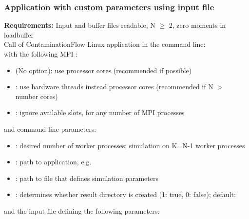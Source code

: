 \subsubsection{Application with custom parameters using input file}
\textbf{Requirements:} Input and buffer files readable, N $\geq$ 2, zero moments in loadbuffer\\[4pt]
Call of ContaminationFlow Linux application in the command line:
\leavevmode\\[-8pt]
with the following MPI :
\begin{itemize}[noitemsep,topsep=0pt, partopsep=0pt]
\item  (No option): use processor cores (recommended if possible)
\item {}: use hardware threads instead processor cores (recommended if N $>$ number cores)
\item {}: ignore available slots, for any number of MPI processes
\end{itemize}
\bigskip
and command line parameters:
\begin{itemize}[noitemsep,topsep=0pt, partopsep=0pt]
\item {}: desired number of worker processes; simulation on K=N-1 worker processes
\item {}: path to application, e.g.\ 
\item {}: path to file that defines simulation parameters
\item {}: determines whether result directory is created (1: true, 0: false); default:
\end{itemize}
\bigskip
and the input file defining the following parameters:

